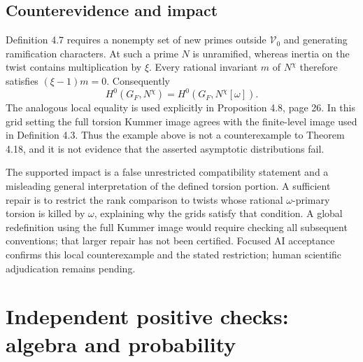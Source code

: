 \documentclass[10pt]{article}
\begin{document}
\subsection*{Counterevidence and impact}
Definition 4.7 requires a nonempty set of new primes outside \(\mathcal V_0\) and generating ramification characters. At such a prime \(N\) is unramified, whereas inertia on the twist contains multiplication by \(\xi\). Every rational invariant \(m\) of \(N^\chi\) therefore satisfies \((\xi-1)m=0\). Consequently \[H^0(G_F,N^\chi)=H^0(G_F,N^\chi[\omega]).\] The analogous local equality is used explicitly in Proposition 4.8, page 26. In this grid setting the full torsion Kummer image agrees with the finite-level image used in Definition 4.3. Thus the example above is not a counterexample to Theorem 4.18, and it is not evidence that the asserted asymptotic distributions fail.\par
The supported impact is a false unrestricted compatibility statement and a misleading general interpretation of the defined torsion portion. A sufficient repair is to restrict the rank comparison to twists whose rational \(\omega\)-primary torsion is killed by \(\omega\), explaining why the grids satisfy that condition. A global redefinition using the full Kummer image would require checking all subsequent conventions; that larger repair has not been certified. Focused AI acceptance confirms this local counterexample and the stated restriction; human scientific adjudication remains pending.\par
\section*{Independent positive checks: algebra and probability}
\end{document}
